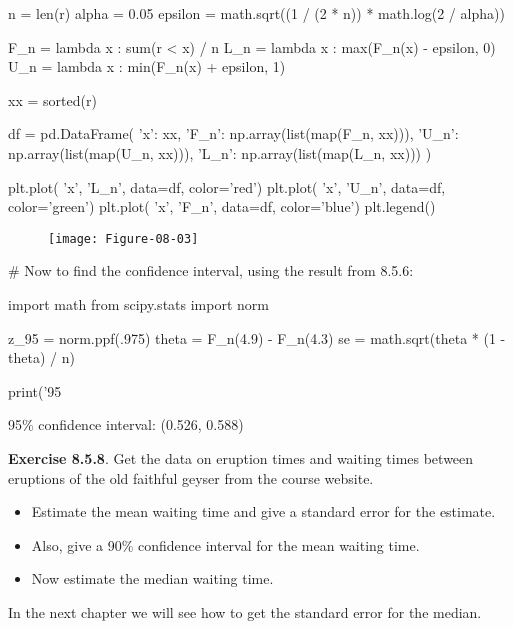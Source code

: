 \begin{python}
n = len(r)
alpha = 0.05
epsilon = math.sqrt((1 / (2 * n)) * math.log(2 / alpha))

F_n = lambda x : sum(r < x) / n
L_n = lambda x : max(F_n(x) - epsilon, 0)
U_n = lambda x : min(F_n(x) + epsilon, 1)

xx = sorted(r)

df = pd.DataFrame({
    'x': xx, 
    'F_n': np.array(list(map(F_n, xx))), 
    'U_n': np.array(list(map(U_n, xx))), 
    'L_n': np.array(list(map(L_n, xx)))
})

plt.plot( 'x', 'L_n', data=df, color='red')
plt.plot( 'x', 'U_n', data=df, color='green')
plt.plot( 'x', 'F_n', data=df, color='blue')
plt.legend()
\end{python}

\begin{figure}[H]
\texttt{[image: Figure-08-03]}
\end{figure}

\begin{python}
# Now to find the confidence interval, using the result from 8.5.6:

import math
from scipy.stats import norm

z_95 = norm.ppf(.975)
theta = F_n(4.9) - F_n(4.3)
se = math.sqrt(theta * (1 - theta) / n)

print('95%
\end{python}

\begin{console}
95\% confidence interval: (0.526, 0.588)
\end{console}

\textbf{Exercise 8.5.8}. Get the data on eruption times and waiting
times between eruptions of the old faithful geyser from the course
website.

\begin{itemize}[tightlist]
\item
  Estimate the mean waiting time and give a standard error for the
  estimate.
\item
  Also, give a 90\% confidence interval for the mean waiting time.
\item
  Now estimate the median waiting time.
\end{itemize}

In the next chapter we will see how to get the standard error for the
median.

